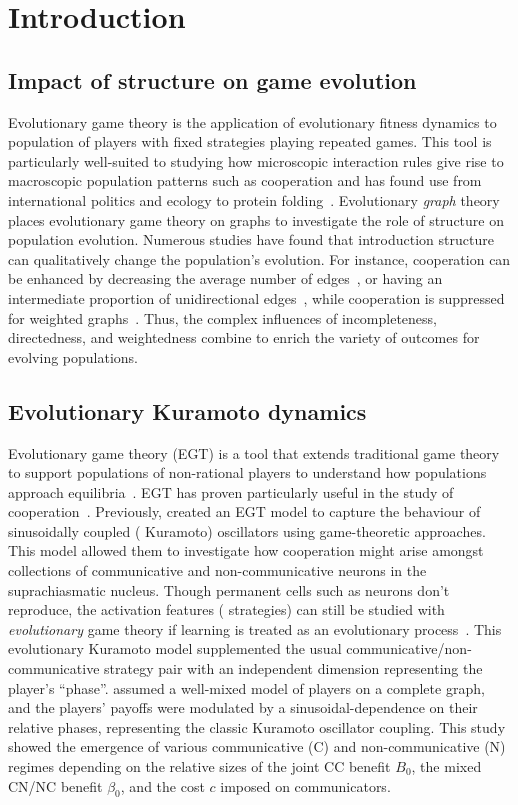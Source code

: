 \documentclass[pdflatex,lineno,referee,sn-mathphys-ay]{sn-jnl}
\begin{document}
\section{Introduction}
\subsection{Impact of structure on game evolution}
Evolutionary game theory is the application of evolutionary fitness dynamics
to population of players with fixed strategies playing repeated games.
This tool is particularly well-suited to studying how microscopic interaction rules
give rise to macroscopic population patterns such as cooperation
and has found use from international politics and ecology
to protein folding~\citep[\cf{}][and references therein]{traulsen2023future}.
Evolutionary \emph{graph} theory places evolutionary game theory
on graphs to investigate the role of structure on population evolution.
Numerous studies have found that introduction structure
can qualitatively change the population's evolution.
For instance, cooperation can be enhanced by
decreasing the average number of edges~\citep{ohtsuki2006simple},
or having an intermediate proportion
of unidirectional edges~\citep{su2022evolution},
while cooperation is suppressed
for weighted graphs~\citep{bhaumik2024constant}.
Thus, the complex influences of
incompleteness, directedness, and weightedness combine
to enrich the variety of outcomes for evolving populations.

\subsection{Evolutionary Kuramoto dynamics}
Evolutionary game theory (EGT) is a tool that extends traditional game theory
to support populations of non-rational players to understand
how populations approach equilibria~\citep{weibull1997evolutionary}.
EGT has proven particularly useful in the study
of cooperation~\citep[\eg{}][and sources therein]{sigmund1999evolutionary}.
Previously, \citet{tripp2022evolutionary} created an EGT model
to capture the behaviour of sinusoidally coupled (\ie{} Kuramoto) oscillators
using game-theoretic approaches.
This model allowed them to investigate how cooperation might arise
amongst collections of communicative and non-communicative neurons
in the suprachiasmatic nucleus.
Though permanent cells such as neurons don't reproduce,
the activation features (\ie{} strategies) can still
be studied with \emph{evolutionary} game theory
if learning is treated as
an evolutionary process~\citep{cohen2009evolutionary}.
This evolutionary Kuramoto model
supplemented the usual communicative/non-communicative
strategy pair with an independent dimension representing the player's ``phase''.
 assumed a well-mixed model of players
on a complete graph, and the players' payoffs were modulated
by a sinusoidal-dependence on their relative phases,
representing the classic Kuramoto oscillator coupling.
This study showed the emergence of various communicative (C)
and non-communicative (N) regimes depending on the relative sizes
of the joint CC benefit $B_0$, the mixed CN/NC benefit $\beta_0$,
and the cost $c$ imposed on communicators.
\end{document}
